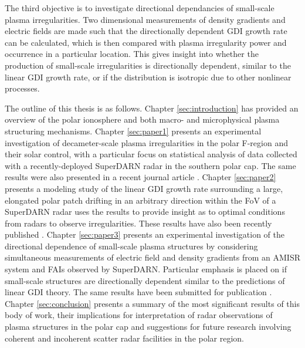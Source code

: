 The third objective is to investigate directional dependancies of small-scale plasma irregularities.  Two dimensional measurements of density gradients and electric fields are made such that the directionally dependent GDI growth rate can be calculated, which is then compared with plasma irregularity power and occurrence in a particular location.  This gives insight into whether the production of small-scale irregularities is directionally dependent, similar to the linear GDI growth rate, or if the distribution is isotropic due to other nonlinear processes.

The outline of this thesis is as follows.  Chapter \ref{sec:introduction} has provided an overview of the polar ionosphere and both macro- and microphysical plasma structuring mechanisms.  Chapter \ref{sec:paper1} presents an experimental investigation of decameter-scale plasma irregularities in the polar F-region and their solar control, with a particular focus on statistical analysis of data collected with a recently-deployed SuperDARN radar in the southern polar cap.  The same results were also presented in a recent journal article \citep{Lamarche2015}.  Chapter \ref{sec:paper2} presents a modeling study of the linear GDI growth rate surrounding a large, elongated polar patch drifting in an arbitrary direction within the FoV of a SuperDARN radar uses the results to provide insight as to optimal conditions from radars to observe irregularities.  These results have also been recently published \citep{Lamarche2016}.  Chapter \ref{sec:paper3} presents an experimental investigation of the directional dependence of small-scale plasma structures by considering simultaneous measurements of electric field and density gradients from an AMISR  system and FAIs observed by SuperDARN.  Particular emphasis is placed on if small-scale structures are directionally dependent similar to the predictions of linear GDI theory.  The same results have been submitted for publication \citep{Lamarche2017}.  Chapter \ref{sec:conclusion} presents a summary of the most significant results of this body of work, their implications for interpretation of radar observations of plasma structures in the polar cap and suggestions for future research involving coherent and incoherent scatter radar facilities in the polar region.




